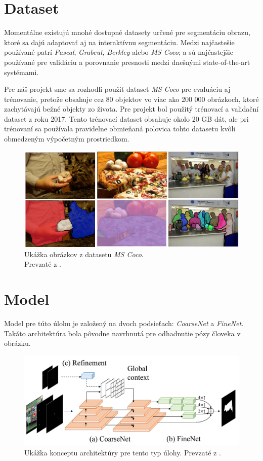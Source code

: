 \documentclass [11pt, a4paper, twocolumn]{article}
\begin{document}
\section{Dataset}
Momentálne existujú mnohé dostupné datasety určené pre segmentáciu obrazu, ktoré sa dajú adaptovať aj na interaktívnu segmentáciu. Medzi najčastešie používané patrí \textit{Pascal}, \textit{Grabcut}, \textit{Berkley} alebo \textit{MS Coco}; a sú najčastejšie používané pre validáciu a porovnanie presnosti medzi dnešnými state-of-the-art systémami.

Pre náš projekt sme sa rozhodli použiť dataset \textit{MS Coco} pre evaluáciu aj trénovanie, pretože obsahuje cez 80 objektov vo viac ako 200 000 obrázkoch, ktoré zachytávajú bežné objekty zo života. Pre projekt bol použitý trénovací a validační dataset z roku 2017. Tento trénovací dataset obsahuje okolo 20 GB dát, ale pri trénovaní sa používala pravidelne obmieňaná polovica tohto datasetu kvôli obmedzeným výpočetným prostriedkom.

\begin{figure}[H]
\centering
\includegraphics[width=\linewidth]{coco}
\caption{Ukážka obrázkov z datasetu \textit{MS Coco}. \\Prevzaté z \cite{coco}.}
\end{figure}

\section{Model}

Model pre túto úlohu je založený na dvoch podsieťach: \textit{CoarseNet} a \textit{FineNet}. Takáto architektúra bola pôvodne navrhnutá pre odhadnutie pózy človeka v obrázku. 

\begin{figure}[H]
\centering
\includegraphics[width=\linewidth]{architecture}
\caption{Ukážka konceptu architektúry pre tento typ úlohy. Prevzaté z \cite{zhang_liew_wei_wei_zhao_2020}.}
\end{figure}
\end{document}
